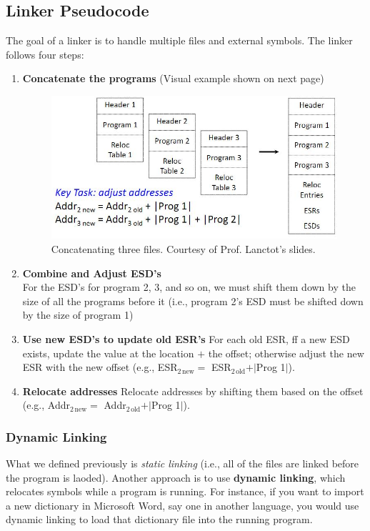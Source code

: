 \documentclass{report}
\begin{document}
\subsection{Linker Pseudocode}
The goal of a linker is to handle multiple files and external symbols. The linker follows four steps:
\begin{enumerate}
\item \textbf{Concatenate the programs} (Visual example shown on next page)\newpage
\begin{figure}[ht]
\begin{center}
\includegraphics[scale=0.5]{concatenate.JPG}
\end{center}
\caption{Concatenating three files. Courtesy of Prof. Lanctot's slides.}
\end{figure}

\item \textbf{Combine and Adjust ESD's} \\
For the ESD's for program 2, 3, and so on, we must shift them down by the size of all the programs before it (i.e., program 2's ESD must be shifted down by the size of program 1)
\item \textbf{Use new ESD's to update old ESR's} For each old ESR, ff a new ESD exists, update the value at the location $+$ the offset; otherwise adjust the new ESR with the new offset (e.g., ESR$_{\mathrm{2 \,new}} = $ ESR$_{\mathrm{2\,old}} + \vert$Prog 1$\vert$).
\item \textbf{Relocate addresses} Relocate addresses by shifting them based on the offset (e.g., Addr$_{\mathrm{2 \,new}} = $ Addr$_{\mathrm{2\,old}} + \vert$Prog 1$\vert$).
\end{enumerate}
\subsubsection{Dynamic Linking}
What we defined previously is \textit{static linking} (i.e., all of the files are linked before the program is laoded). Another approach is to use \textbf{dynamic linking}, which relocates symbols while a program is running. For instance, if you want to import a new dictionary in Microsoft Word, say one in another language, you would use dynamic linking to load that dictionary file into the running program.
\end{document}
